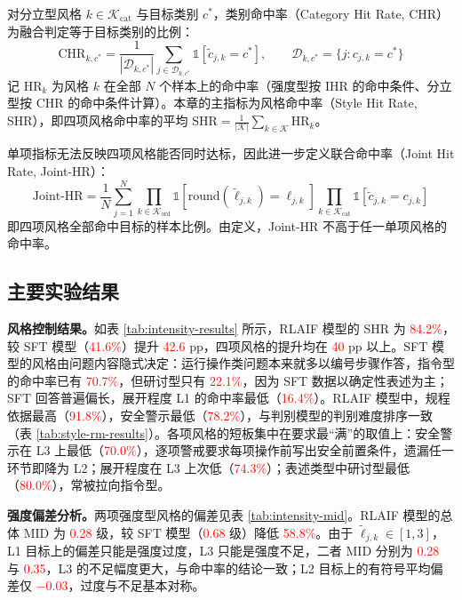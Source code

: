 \documentclass[fontset=fandol,type=master,campus=shenzhen,etitleauto=true]{hithesisbook}
\newcommand{\rev}[1]{\textcolor{red}{#1}}
\begin{document}
对分立型风格 $k \in \mathcal{K}_{\text{cat}}$ 与目标类别 $c^*$，类别命中率（Category Hit Rate, CHR）为融合判定等于目标类别的比例：
\begin{equation}
\text{CHR}_{k,c^*} = \frac{1}{|\mathcal{D}_{k,c^*}|} \sum_{j \in \mathcal{D}_{k,c^*}} \mathbb{1}\!\left[\tilde{c}_{j,k} = c^*\right], \qquad \mathcal{D}_{k,c^*} = \{ j : c_{j,k} = c^* \}
\end{equation}
记 $\text{HR}_k$ 为风格 $k$ 在全部 $N$ 个样本上的命中率（强度型按 IHR 的命中条件、分立型按 CHR 的命中条件计算）。本章的主指标为风格命中率（Style Hit Rate, SHR），即四项风格命中率的平均 $\text{SHR} = \frac{1}{|\mathcal{K}|}\sum_{k \in \mathcal{K}} \text{HR}_k$。

单项指标无法反映四项风格能否同时达标，因此进一步定义联合命中率（Joint Hit Rate, Joint-HR）：
\begin{equation}\label{eq:joint-ihr}
\text{Joint-HR} = \frac{1}{N} \sum_{j=1}^{N} \prod_{k \in \mathcal{K}_{\text{ord}}} \mathbb{1}\!\left[\text{round}(\tilde{\ell}_{j,k}) = \ell_{j,k}\right] \prod_{k \in \mathcal{K}_{\text{cat}}} \mathbb{1}\!\left[\tilde{c}_{j,k} = c_{j,k}\right]
\end{equation}
即四项风格全部命中目标的样本比例。由定义，Joint-HR 不高于任一单项风格的命中率。

\subsection{主要实验结果}\label{ux4e3bux8981ux7ed3ux679c-1}

\textbf{风格控制结果。}如表 \ref{tab:intensity-results} 所示，RLAIF 模型的 SHR 为 \rev{84.2\%}，较 SFT 模型（\rev{41.6\%}）提升 \rev{42.6} pp，四项风格的提升均在 \rev{40} pp 以上。SFT 模型的风格由问题内容隐式决定：运行操作类问题本来就多以编号步骤作答，指令型的命中率已有 \rev{70.7\%}，但研讨型只有 \rev{22.1\%}，因为 SFT 数据以确定性表述为主；SFT 回答普遍偏长，展开程度 L1 的命中率最低（\rev{16.4\%}）。RLAIF 模型中，规程依据最高（\rev{91.8\%}），安全警示最低（\rev{78.2\%}），与判别模型的判别难度排序一致（表 \ref{tab:style-rm-results}）。各项风格的短板集中在要求最“满”的取值上：安全警示在 L3 上最低（\rev{70.0\%}），逐项警戒要求每项操作前写出安全前置条件，遗漏任一环节即降为 L2；展开程度在 L3 上次低（\rev{74.3\%}）；表述类型中研讨型最低（\rev{80.0\%}），常被拉向指令型。

\textbf{强度偏差分析。}两项强度型风格的偏差见表 \ref{tab:intensity-mid}。RLAIF 模型的总体 MID 为 \rev{0.28} 级，较 SFT 模型（\rev{0.68} 级）降低 \rev{58.8\%}。由于 $\tilde{\ell}_{j,k} \in [1, 3]$，L1 目标上的偏差只能是强度过度，L3 只能是强度不足，二者 MID 分别为 \rev{0.28} 与 \rev{0.35}，L3 的不足幅度更大，与命中率的结论一致；L2 目标上的有符号平均偏差仅 \rev{$-0.03$}，过度与不足基本对称。
\end{document}
